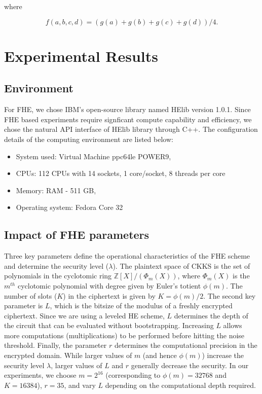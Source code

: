 \documentclass[letterpaper]{article} %
\begin{document}
\noindent where

 \begin{equation}
      \label{eqn:ActPool}
       f(a,b,c,d) = (g(a)+g(b)+g(c)+g(d))/4.
\end{equation}

\section{Experimental Results}
\label{sec:experiments}

\subsection{Environment}
For FHE, we chose IBM's open-source library named HElib \cite{helib} version 1.0.1. Since FHE based experiments require signficant compute capability and efficiency, we chose the natural API interface of HElib library through C++. The configuration details of the computing environment are listed below:

\begin{itemize}
\item System used: Virtual Machine ppc64le POWER9,
\item CPUs: 112 CPUs with 14 sockets, 1 core/socket, 8 threads per core
\item Memory: RAM  - 511 GB,
\item Operating system: Fedora Core 32
\end{itemize}

\subsection{Impact of FHE parameters}
Three key parameters define the operational characteristics of the FHE scheme and determine the security level ($\lambda$). The plaintext space of CKKS is the set of polynomials in the cyclotomic ring $\mathbb{Z}[X]/(\Phi_m(X))$, where $\Phi_m(X)$ is the $m^{th}$ cyclotomic polynomial with degree given by Euler's totient $\phi(m)$. The number of slots ($K$) in the ciphertext is given by $K = \phi(m)/2$. The second key parameter is $L$, which is the bitsize of the modulus of a freshly encrypted ciphertext. Since we are using a leveled HE scheme, $L$ determines the depth of the circuit that can be evaluated without bootstrapping. Increasing $L$ allows more computations (multiplications) to be performed before hitting the noise threshold. Finally, the parameter $r$ determines the computational precision in the encrypted domain. While larger values of $m$ (and hence $\phi(m)$) increase the security level $\lambda$, larger values of $L$ and $r$ generally decrease the security. In our experiments, we choose $m = 2^{16}$ (corresponding to $\phi(m) = 32768$ and $K = 16384$), $r = 35$, and vary $L$ depending on the computational depth required.
\end{document}
